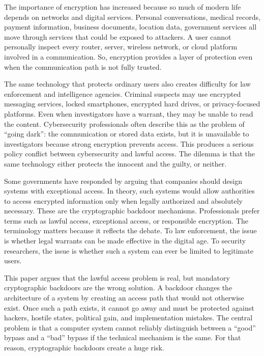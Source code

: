 \documentclass{easychair}
\begin{document}
The importance of encryption has increased because so much of modern life depends on networks and digital services. Personal conversations, medical records, payment information, business documents, location data,  government services all move through services that could be exposed to attackers. A user cannot personally inspect every router, server, wireless network, or cloud platform involved in a communication. So, encryption provides a layer of protection even when the communication path is not fully trusted.

The same technology that protects ordinary users also creates difficulty for law enforcement and intelligence agencies. Criminal suspects may use encrypted messaging services, locked smartphones, encrypted hard drives, or privacy-focused platforms. Even when investigators have a warrant, they may be unable to read the content. Cybersecurity professionals often describe this as the problem of ``going dark'': the communication or stored data exists, but it is unavailable to investigators because strong encryption prevents access. This produces a serious policy conflict between cybersecurity and lawful access. The dilemma is that the same technology either protects the innocent and the guilty, or neither.

Some governments have responded by arguing that companies should design systems with exceptional access. In theory, such systems would allow authorities to access encrypted information only when legally authorized and absolutely necessary. These are the cryptographic backdoor mechanisms. Professionals prefer terms such as lawful access, exceptional access, or responsible encryption. The terminology matters because it reflects the debate. To law enforcement, the issue is whether legal warrants can be made effective in the digital age. To security researchers, the issue is whether such a system can ever be limited to legitimate users.

This paper argues that the lawful access problem is real, but mandatory cryptographic backdoors are the wrong solution. A backdoor changes the architecture of a system by creating an access path that would not otherwise exist. Once such a path exists, it cannot go away and must be protected against hackers, hostile states, political gain, and implementation mistakes. The central problem is that a computer system cannot reliably distinguish between a ``good'' bypass and a ``bad'' bypass if the technical mechanism is the same. For that reason, cryptographic backdoors create a huge risk.
\end{document}

